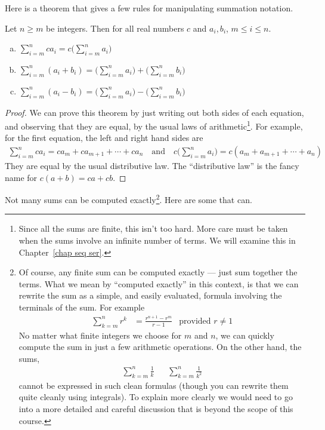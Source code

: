 Here is a theorem that gives a few rules for manipulating summation notation.
\begin{theorem}\label{thm:INTsummationArith}
Let $n\ge m$ be integers. Then for all real numbers $c$ and $a_i,b_i$,
$m\le i\le n$.
\begin{enumerate}[(a)]
\item $\sum\limits_{i=m}^nca_i = c\bigg(\sum\limits_{i=m}^na_i\bigg)$
\item $\sum\limits_{i=m}^n(a_i+b_i) = \bigg(\sum\limits_{i=m}^na_i\bigg)
                                    + \bigg(\sum\limits_{i=m}^nb_i\bigg)$
\item $\sum\limits_{i=m}^n(a_i-b_i) = \bigg(\sum\limits_{i=m}^na_i\bigg)
                                    - \bigg(\sum\limits_{i=m}^nb_i\bigg)$
\end{enumerate}
\end{theorem}
\begin{proof}
We can prove this theorem by just writing out both sides of each equation,
and observing that they are equal, by the usual laws of arithmetic\footnote{Since all
the sums are finite, this isn't too hard. More care must be taken when the sums involve
an infinite number of terms. We will examine this in Chapter~\ref{chap seq ser}.}. For
example, for the first equation, the left and right hand sides are
\begin{align*}
\sum_{i=m}^nca_i = ca_m+ca_{m+1}+\cdots+ca_n
\quad\text{and}\quad
c\bigg(\sum\limits_{i=m}^na_i\bigg) = c(a_m+a_{m+1}+\cdots+a_n)
\end{align*}
They are equal by the usual distributive law. The ``distributive law''
is the fancy name for $c(a+b)=ca+cb$.
\end{proof}\goodbreak
Not many sums can be computed exactly\footnote{Of course, any finite sum can be computed
exactly --- just sum together the terms. What we mean by ``computed exactly'' in this
context, is that we can rewrite the sum as a simple, and easily
evaluated, formula involving the terminals of the sum. For example
\begin{align*}
  \sum_{k=m}^n r^k &= \frac{r^{n+1}-r^m}{r-1} &\text{provided $r\neq1$}
\end{align*}
No matter what finite integers we choose for $m$ and $n$, we can quickly compute the sum
in just a few arithmetic operations. On the other hand, the sums,
\begin{align*}
\sum_{k=m}^n \frac{1}{k} &&
\sum_{k=m}^n \frac{1}{k^2}
\end{align*}
cannot be expressed in such clean formulas (though you can rewrite them quite cleanly
using integrals). To explain more clearly we would need to go into a more detailed and
careful discussion that is beyond the scope of this course. }. Here are some that can.
